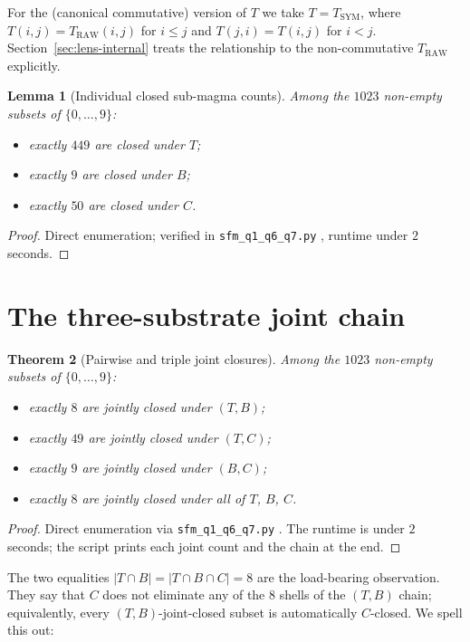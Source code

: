 \documentclass[11pt,reqno]{amsart}
\newtheorem{theorem}{Theorem}[section]
\newtheorem{lemma}[theorem]{Lemma}
\theoremstyle{definition}
\newcommand{\TRAW}{T_{\mathrm{RAW}}}
\newcommand{\TSYM}{T_{\mathrm{SYM}}}
\begin{document}
For the (canonical commutative) version of $T$ we take
$T = \TSYM$, where $T(i,j) = \TRAW(i,j)$ for $i\leq j$ and
$T(j,i) = T(i,j)$ for $i<j$. Section~\ref{sec:lens-internal}
treats the relationship to the non-commutative
$\TRAW$ explicitly.

\begin{lemma}[Individual closed sub-magma counts]
\label{lem:individual-counts}
Among the $1023$ non-empty subsets of $\{0,\dots,9\}$:
\begin{itemize}[leftmargin=*]
\item exactly $449$ are closed under $T$;
\item exactly $9$ are closed under $B$;
\item exactly $50$ are closed under $C$.
\end{itemize}
\end{lemma}

\begin{proof}
Direct enumeration; verified in \texttt{sfm\_q1\_q6\_q7.py}
\cite{SFM2026}, runtime under $2$ seconds.
\end{proof}

\section{The three-substrate joint chain}
\label{sec:enumeration}

\begin{theorem}[Pairwise and triple joint closures]
\label{thm:joint-counts}
Among the $1023$ non-empty subsets of $\{0,\dots,9\}$:
\begin{itemize}[leftmargin=*]
\item exactly $8$ are jointly closed under $(T,B)$;
\item exactly $49$ are jointly closed under $(T,C)$;
\item exactly $9$ are jointly closed under $(B,C)$;
\item exactly $8$ are jointly closed under all of $T$, $B$, $C$.
\end{itemize}
\end{theorem}

\begin{proof}
Direct enumeration via \texttt{sfm\_q1\_q6\_q7.py} \cite{SFM2026}.
The runtime is under $2$ seconds; the script prints each joint
count and the chain at the end.
\end{proof}

The two equalities $|T \cap B| = |T \cap B \cap C| = 8$ are the
load-bearing observation. They say that $C$ does not eliminate
any of the $8$ shells of the $(T,B)$ chain; equivalently, every
$(T,B)$-joint-closed subset is automatically $C$-closed. We
spell this out:
\end{document}
